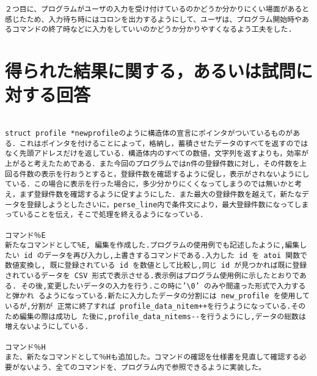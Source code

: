 \documentclass[a4j]{jarticle}
\begin{document}
\begin{enumerate}
\begin{verbatim}
２つ目に、プログラムがユーザの入力を受け付けているのかどうか分かりにくい場面があると感じたため、入力待ち時にはコロンを出力するようにして、ユーザは、プログラム開始時やあるコマンドの終了時などに入力をしていいのかどうか分かりやすくなるよう工夫をした.

\end{verbatim}

%
%

\section{得られた結果に関する，あるいは試問に対する回答}

\begin{verbatim}

struct profile *newprofileのように構造体の宣言にポインタがついているものがある．これはポインタを付けることによって，格納し，蓄積させたデータのすべてを返すのではなく先頭アドレスだけを返している．構造体内のすべての数値，文字列を返すよりも，効率が上がると考えたためである．また今回のプログラムではn件の登録件数に対し，その件数を上回る件数の表示を行おうとすると，登録件数を確認するように促し，表示がされないようにしている．この場合に表示を行った場合に，多少分かりにくくなってしまうのでは無いかと考え，まず登録件数を確認するように促すようにした．また最大の登録件数を越えて，新たなデータを登録しようとしたさいに，perse_line内で条件文により，最大登録件数になってしまっていることを伝え，そこで処理を終えるようになっている．

コマンド％E
新たなコマンドとして%E, 編集を作成した.プログラムの使用例でも記述したように,編集したい id のデータを再び入力し,上書きするコマンドである.入力した id を atoi 関数で数値変換し, 既に登録されている id を数値として比較し,同じ id が見つかれば既に登録されているデータを CSV 形式で表示させる.表示例はプログラム使用例に示したとおりである. その後,変更したいデータの入力を行う.この時に’\0’ のみや間違った形式で入力すると弾かれ るようになっている.新たに入力したデータの分割には new_profile を使用しているが,分割が 正常に終了すれば profile_data_nitem++を行うようになっている.そのため編集の際は成功し た後に,profile_data_nitems--を行うようにし,データの総数は増えないようにしている.

コマンド％H
また、新たなコマンドとして％Hも追加した。コマンドの確認を仕様書を見直して確認する必要がないよう、全てのコマンドを、プログラム内で参照できるように実装した。

\end{verbatim}


\end{enumerate}
\end{document}
